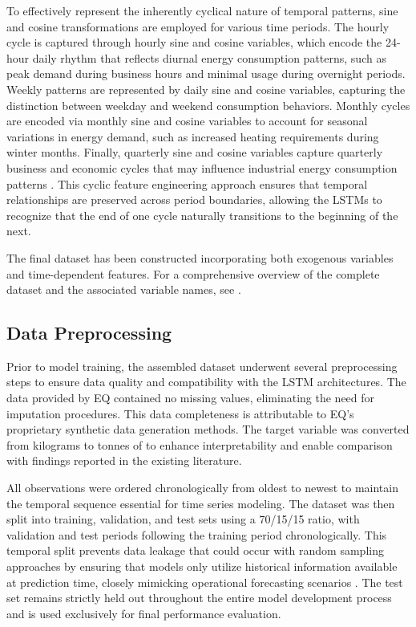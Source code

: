 To effectively represent the inherently cyclical nature of temporal patterns, sine and cosine transformations are employed for various time periods. The hourly cycle is captured through hourly sine and cosine variables, which encode the 24-hour daily rhythm that reflects diurnal energy consumption patterns, such as peak demand during business hours and minimal usage during overnight periods. Weekly patterns are represented by daily sine and cosine variables, capturing the distinction between weekday and weekend consumption behaviors. Monthly cycles are encoded via monthly sine and cosine variables to account for seasonal variations in energy demand, such as increased heating requirements during winter months. Finally, quarterly sine and cosine variables capture quarterly business and economic cycles that may influence industrial energy consumption patterns \parencite{yasmeen2022}. This cyclic feature engineering approach ensures that temporal relationships are preserved across period boundaries, allowing the LSTMs to recognize that the end of one cycle naturally transitions to the beginning of the next.

The final dataset has been constructed incorporating both exogenous variables and time-dependent features. For a comprehensive overview of the complete dataset and the associated variable names, see .

\subsection{Data Preprocessing}

Prior to model training, the assembled dataset underwent several preprocessing steps to ensure data quality and compatibility with the LSTM architectures. The data provided by EQ contained no missing values, eliminating the need for imputation procedures. This data completeness is attributable to EQ's proprietary synthetic data generation methods. The target variable was converted from kilograms to tonnes of \cotwoe to enhance interpretability and enable comparison with findings reported in the existing literature.

All observations were ordered chronologically from oldest to newest to maintain the temporal sequence essential for time series modeling. The dataset was then split into training, validation, and test sets using a 70/15/15 ratio, with validation and test periods following the training period chronologically. This temporal split prevents data leakage that could occur with random sampling approaches by ensuring that models only utilize historical information available at prediction time, closely mimicking operational forecasting scenarios \parencite{cerqueira2020,tashman2000}. The test set remains strictly held out throughout the entire model development process and is used exclusively for final performance evaluation.

